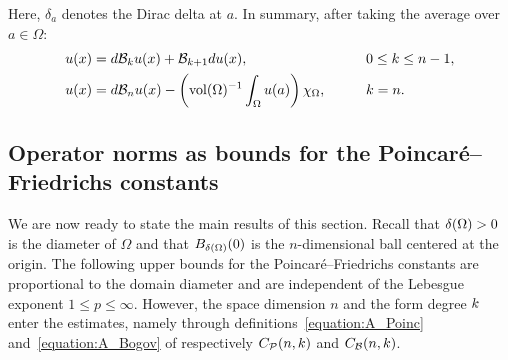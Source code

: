 \documentclass[10pt,a4paper]{article}
\begin{document}
Here, $\delta_a$ denotes the Dirac delta at $a$. 
In summary, after taking the average over $a \in \Omega$:
\begin{alignat}{4}\label{math:hodgedecomposition:bogov}
    u(x) &= d {\mathcal B}_{k} u(x) + {\mathcal B}_{k+1} d u(x),                                   \qquad && 0 \leq k \leq n-1,
    \\
    u(x) &= d {\mathcal B}_{n} u(x) - \left( \operatorname{vol}(\Omega)^{-1} \int_{\Omega} u(a) \right) \chi_{\Omega}, \qquad && k = n.
\end{alignat}


\subsection{Operator norms as bounds for the Poincar\'e--Friedrichs constants}

We are now ready to state the main results of this section. 
Recall that ${\delta}(\Omega) > 0$ is the diameter of $\Omega$ and that $B_{{\delta}(\Omega)}(0)$ is the $n$-dimensional ball centered at the origin.
The following upper bounds for the Poincar\'e--Friedrichs constants are proportional to the domain diameter and are independent of the Lebesgue exponent $1 \leq p \leq \infty$.
However, the space dimension $n$ and the form degree $k$ enter the estimates, 
namely through definitions~\eqref{equation:A_Poinc} and~\eqref{equation:A_Bogov} of respectively $C_{{\mathcal P}}(n,k)$ and $C_{{\mathcal B}}(n,k)$. 
\end{document}
